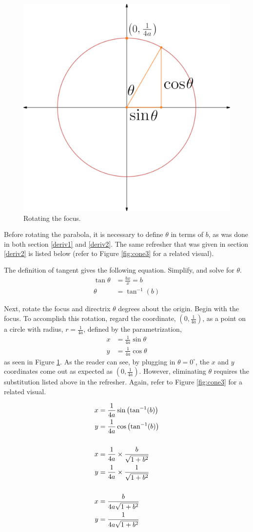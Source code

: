 \documentclass{article}
\begin{document}
\begin{figure}[h!]
  \centering
  \includegraphics[width=0.54\linewidth]{Blender/ParabolaLineIntegration-DiskParameter-f_0001.png}
  \caption{Rotating the focus.}
  \label{fig:disk3}
\end{figure}\par

Before rotating the parabola, it is necessary to define $\theta$ in terms of $b$, as was done in both section \ref{deriv1} and \ref{deriv2}. The same refresher that was given in section \ref{deriv2} is listed below (refer to Figure \ref{fig:cone3} for a related visual).\par
The definition of tangent gives the following equation. Simplify, and solve for $\theta$.
\begin{align*}
\tan\theta &=\frac{bx}{x}=b\\
\theta       &= \tan^{-1}\left(b\right)
\end{align*}\par
Next, rotate the focus and directrix $\theta$ degrees about the origin. Begin with the focus. To accomplish this rotation, regard the coordinate, $\left(0,\frac{1}{4a}\right)$, as a point on a circle with radius, $r=\frac{1}{4a}$, defined by the parametrization,
\begin{align*}
x &= \frac{1}{4a}\sin\theta\\
y &= \frac{1}{4a}\cos\theta
\end{align*}
as seen in Figure \ref{fig:disk3}. As the reader can see, by plugging in $\theta=0^\circ$, the $x$ and $y$ coordinates come out as expected as $\left(0,\frac{1}{4a}\right)$. However, eliminating $\theta$ requires the substitution listed above in the refresher. Again, refer to Figure \ref{fig:cone3} for a related visual.

\begin{align*}
x &= \frac{1}{4a}\sin\left(\tan^{-1}(b)\right)\\
y &= \frac{1}{4a}\cos\left(\tan^{-1}(b)\right)\\
\vspace{1em}\\
x &= \frac{1}{4a}\times\frac{b}{\sqrt{1+b^2}}\\
y &= \frac{1}{4a}\times\frac{1}{\sqrt{1+b^2}}\\
\vspace{1em}\\
x &= \frac{b}{4a\sqrt{1+b^2}}\\
y &= \frac{1}{4a\sqrt{1+b^2}}
\end{align*}
\end{document}
